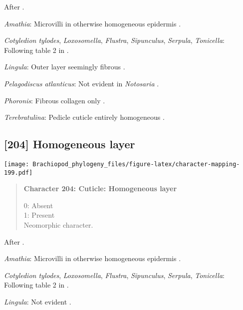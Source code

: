 \documentclass[openany]{book}
\theoremstyle{definition}
\theoremstyle{definition}
\theoremstyle{definition}
\theoremstyle{remark}
\begin{document}
After \citet{Borisanova2015}.

\hypertarget{Amathia-coding-203}{}
\emph{Amathia}: Microvilli in otherwise homogeneous epidermis
\citep{Williams1997Introduction}.

\hypertarget{Cotyledion_tylodes-coding-203}{}
\emph{Cotyledion tylodes}, \emph{Loxosomella}, \emph{Flustra},
\emph{Sipunculus}, \emph{Serpula}, \emph{Tonicella}: Following table 2
in \citet{Borisanova2015}.

\hypertarget{Lingula-coding-203}{}
\emph{Lingula}: Outer layer seemingly fibrous \citep{BereiterHahn1984}.

\hypertarget{Pelagodiscus_atlanticus-coding-203}{}
\emph{Pelagodiscus atlanticus}: Not evident in \emph{Notosaria}
\citep{BereiterHahn1984, Williams1997Introduction}.

\hypertarget{Phoronis-coding-203}{}
\emph{Phoronis}: Fibrous collagen only \citep{BereiterHahn1984}.

\hypertarget{Terebratulina-coding-203}{}
\emph{Terebratulina}: Pedicle cuticle entirely homogeneous
\citep{Williams1997Introduction}.

\subsection*{{[}204{]} Homogeneous layer}\label{homogeneous-layer}

\texttt{[image: Brachiopod\_phylogeny\_files/figure-latex/character-mapping-199.pdf]}

\begin{quote}
\textbf{Character 204: Cuticle: Homogeneous layer}

0: Absent\\
1: Present\\
Neomorphic character.
\end{quote}

After \citet{Borisanova2015}.

\hypertarget{Amathia-coding-204}{}
\emph{Amathia}: Microvilli in otherwise homogeneous epidermis
\citep{Williams1997Introduction}.

\hypertarget{Cotyledion_tylodes-coding-204}{}
\emph{Cotyledion tylodes}, \emph{Loxosomella}, \emph{Flustra},
\emph{Sipunculus}, \emph{Serpula}, \emph{Tonicella}: Following table 2
in \citet{Borisanova2015}.

\hypertarget{Lingula-coding-204}{}
\emph{Lingula}: Not evident \citep{BereiterHahn1984}.
\end{document}
